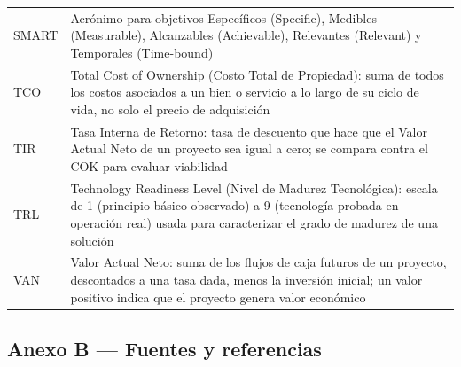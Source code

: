 \documentclass[11pt,a4paper]{article}
\begin{document}
{\begin{longtable}[]{@{}
  >{\raggedright\arraybackslash}p{}
  >{\raggedright\arraybackslash}p{}@{}}
SMART & Acrónimo para objetivos Específicos (Specific), Medibles (Measurable), Alcanzables (Achievable), Relevantes (Relevant) y Temporales (Time-bound) \\
TCO & Total Cost of Ownership (Costo Total de Propiedad): suma de todos los costos asociados a un bien o servicio a lo largo de su ciclo de vida, no solo el precio de adquisición \\
TIR & Tasa Interna de Retorno: tasa de descuento que hace que el Valor Actual Neto de un proyecto sea igual a cero; se compara contra el COK para evaluar viabilidad \\
TRL & Technology Readiness Level (Nivel de Madurez Tecnológica): escala de 1 (principio básico observado) a 9 (tecnología probada en operación real) usada para caracterizar el grado de madurez de una solución \\
VAN & Valor Actual Neto: suma de los flujos de caja futuros de un proyecto, descontados a una tasa dada, menos la inversión inicial; un valor positivo indica que el proyecto genera valor económico \\
\end{longtable}
}

\subsection{Anexo B --- Fuentes y referencias}\label{anexo-b-fuentes-y-referencias}
\end{document}
